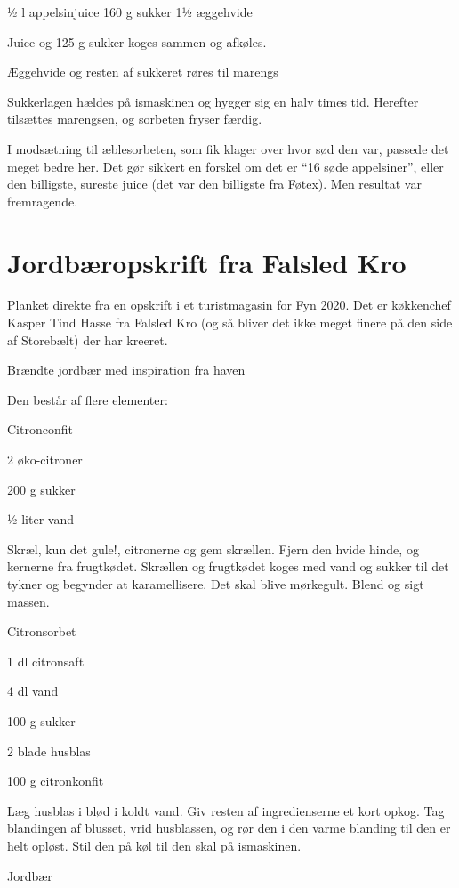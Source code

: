 \documentclass[
]{book}
\begin{document}
½ l appelsinjuice
160 g sukker
1½ æggehvide

Juice og 125 g sukker koges sammen og afkøles.~

Æggehvide og resten af sukkeret røres til marengs

Sukkerlagen hældes på ismaskinen og hygger sig en halv times tid. Herefter tilsættes marengsen, og sorbeten fryser færdig.

I modsætning til æblesorbeten, som fik klager over hvor sød den var, passede det meget bedre her. Det gør sikkert en forskel om det er ``16 søde appelsiner'', eller den billigste, sureste juice (det var den billigste fra Føtex). Men resultat var fremragende.

\hypertarget{jordbuxe6ropskrift-fra-falsled-kro}{%
\section{Jordbæropskrift fra Falsled Kro}\label{jordbuxe6ropskrift-fra-falsled-kro}}

Planket direkte fra en opskrift i et turistmagasin for Fyn 2020. Det er køkkenchef Kasper Tind Hasse fra Falsled Kro (og så bliver det ikke meget finere på den side af Storebælt) der har kreeret.

Brændte jordbær med inspiration fra haven

Den består af flere elementer:

Citronconfit

2 øko-citroner

200 g sukker

½ liter vand

Skræl, kun det gule!, citronerne og gem skrællen. Fjern den hvide hinde, og kernerne fra frugtkødet. Skrællen og frugtkødet koges med vand og sukker til det tykner og begynder at karamellisere. Det skal blive mørkegult. Blend og sigt massen.

Citronsorbet

1 dl citronsaft

4 dl vand

100 g sukker

2 blade husblas

100 g citronkonfit

Læg husblas i blød i koldt vand. Giv resten af ingredienserne et kort opkog. Tag blandingen af blusset, vrid husblassen, og rør den i den varme blanding til den er helt opløst. Stil den på køl til den skal på ismaskinen.

Jordbær
\end{document}
